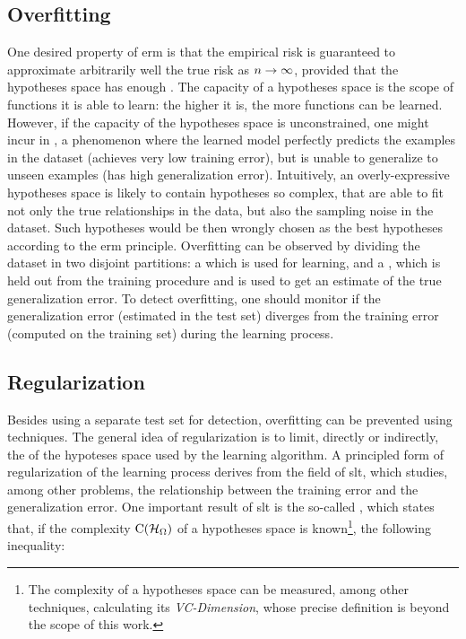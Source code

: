 \subsection{Overfitting}
One desired property of \gls{erm} is that the empirical risk is guaranteed to approximate arbitrarily well the true risk as $n \shortrightarrow \infty$, provided that the hypotheses space has enough . The capacity of a hypotheses space is the scope of functions it is able to learn: the higher it is, the more  functions can be learned. However, if the capacity of the hypotheses space is unconstrained, one might incur in , a phenomenon where the learned model perfectly predicts the examples in the dataset (achieves very low training error), but is unable to generalize to unseen examples (has high generalization error). Intuitively, an overly-expressive hypotheses space is likely to contain hypotheses so complex, that are able to fit not only the true relationships in the data, but also the sampling noise in the dataset. Such hypotheses would be then wrongly chosen as the best hypotheses according to the \gls{erm} principle. Overfitting can be observed by dividing the dataset in two disjoint partitions: a  which is used for learning, and a , which is held out from the training procedure and is used to get an estimate of the true generalization error. To detect overfitting, one should monitor if the generalization error (estimated in the test set) diverges from the training error (computed on the training set) during the learning process.

\subsection{Regularization}
Besides using a separate test set for detection, overfitting can be prevented \apriori using  techniques. The general idea of regularization is to limit, directly or indirectly, the  of the hypoteses space used by the learning algorithm. A principled form of regularization of the learning process derives from the field of \gls{slt}, which studies, among other problems, the relationship between the training error and the generalization error.  One important result of \gls{slt} is the so-called , which states that, if the complexity $\Fun{C}(\HypSpace)$ of a hypotheses space is known\footnote{The complexity of a hypotheses space can be measured, among other techniques, calculating its \emph{VC-Dimension}, whose precise definition is beyond the scope of this work.}, the following inequality:


